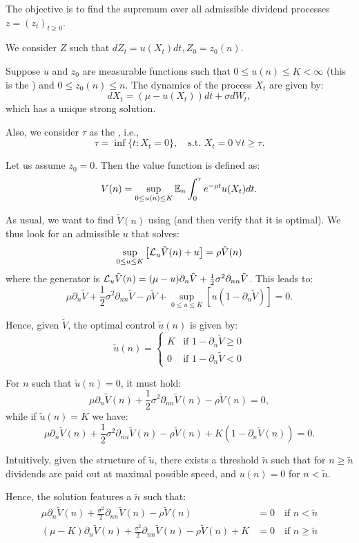 The objective is to find the supremum over all admissible dividend processes $z = (z_t)_{t \geq 0}$.

\begin{remark}
    We consider $Z$ such that $dZ_t = u(X_t) dt, Z_0 = z_0(n)$.
    
    Suppose $u$ and $z_0$ are measurable functions such that $0 \leq u(n) \leq K < \infty$ (this is the ) and $0 \leq z_0(n) \leq n$. The dynamics of the process $X_t$ are given by:
    \[ dX_t = (\mu - u(X_t)) dt + \sigma dW_t, \]
    which has a unique strong solution. 
    
    Also, we consider $\tau$ as the , i.e.,
    \[ \tau = \inf \{t : X_t = 0\}, \quad \text{s.t. } X_t = 0 \ \forall t \geq \tau. \]
    
    Let us assume $z_0 = 0$. Then the value function is defined as:
    \[ V(n) = \sup_{0 \leq u(n) \leq K} \mathbb E_n \int_0^\tau e^{-\rho t} u(X_t) dt. \]
    
    As usual, we want to find $\tilde{V}(n)$ using  (and then verify that it is optimal). We thus look for an admissible $u$ that solves:
    \[ \sup_{0 \leq u \leq K} \left[ \mathcal{L}_u \tilde{V}(n) + u \right] = \rho \tilde{V}(n) \]
    where the generator is $\mathcal{L}_u \tilde{V}(n) = (\mu - u) \partial_n \tilde{V} + \frac{1}{2} \sigma^2 \partial_{nn} \tilde{V}$. This leads to:
    \[ \mu \partial_n \tilde{V} + \frac{1}{2} \sigma^2 \partial_{nn} \tilde{V} - \rho \tilde{V} + \sup_{0 \leq u \leq K} \left[ u(1 - \partial_n \tilde{V}) \right] = 0. \]
    
    Hence, given $\tilde{V}$, the optimal control $\tilde{u}(n)$ is given by:
    \[ \tilde{u}(n) = \begin{cases} K & \text{if } 1 - \partial_n \tilde{V} \geq 0 \\ 0 & \text{if } 1 - \partial_n \tilde{V} < 0 \end{cases} \]
    
    For $n$ such that $\tilde{u}(n) = 0$, it must hold:
    \[ \mu \partial_n \tilde{V}(n) + \frac{1}{2} \sigma^2 \partial_{nn} \tilde{V}(n) - \rho \tilde{V}(n) = 0, \]
    while if $\tilde{u}(n) = K$ we have:
    \[ \mu \partial_n \tilde{V}(n) + \frac{1}{2} \sigma^2 \partial_{nn} \tilde{V}(n) - \rho \tilde{V}(n) + K(1 - \partial_n \tilde{V}(n)) = 0. \]
    
    Intuitively, given the structure of $\tilde{u}$, there exists a threshold $\tilde{n}$ such that for $n \geq \tilde{n}$ dividends are paid out at maximal possible speed, and $u(n) = 0$ for $n < \tilde{n}$. 
    
    Hence, the solution features a  $\tilde{n}$ such that:
    \begin{align*}
        \mu \partial_n \tilde{V}(n) + \frac{\sigma^2}{2} \partial_{nn} \tilde{V}(n) - \rho \tilde{V}(n) &= 0 \quad \text{if } n < \tilde{n} \tag{*} \\
        (\mu - K) \partial_n \tilde{V}(n) + \frac{\sigma^2}{2} \partial_{nn} \tilde{V}(n) - \rho \tilde{V}(n) + K &= 0 \quad \text{if } n \geq \tilde{n} \tag{**}
    \end{align*}
\end{remark}


